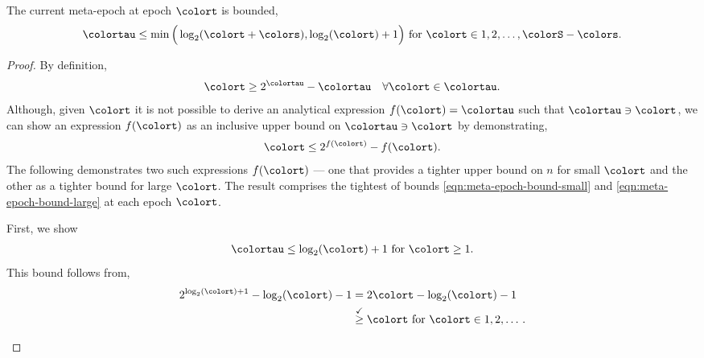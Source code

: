 \begin{lemma}
\label{thm:meta-epoch-bound}
The current meta-epoch at epoch $\colort$ is bounded,
\begin{align*}
\colortau \leq
\min\Big(
  \log_2(\colort + \colors),
  \log_2(\colort) + 1
\Big)
\text{ for } \colort \in 1, 2, \ldots, \colorS - \colors.
\end{align*}
\end{lemma}
\begin{proof}

By definition,
\begin{align*}
\colort \geq 2^{\colortau} - \colortau \quad \forall \colort \in \colortau.
\end{align*}
Although, given $\colort$ it is not possible to derive an analytical expression $f(\colort) = \colortau$ such that $\colortau \ni \colort$, we can show an expression $f(\colort)$ as an inclusive upper bound on $\colortau \ni \colort$ by demonstrating,
\begin{align*}
\colort \leq 2^{f(\colort)} - f(\colort).
\end{align*}
The following demonstrates two such expressions $f(\colort)$ --- one that provides a tighter upper bound on $n$ for small $\colort$ and the other as a tighter bound for large $\colort$.
The result comprises the tightest of bounds \ref{eqn:meta-epoch-bound-small} and \ref{eqn:meta-epoch-bound-large} at each epoch $\colort$.

\begin{proofpart}
First, we show
\begin{align}
\colortau \leq \log_2(\colort) + 1 \text{ for } \colort \geq 1.
\label{eqn:meta-epoch-bound-small}
\end{align}
This bound follows from,
\begin{align*}
2^{\log_{2}(\colort) + 1} - \log_2(\colort) - 1
&= 2\colort - \log_2(\colort) - 1 \\
&\stackrel{\checkmark}{\geq} \colort \text{ for } \colort \in 1, 2, \ldots \, .
\end{align*}
\end{proofpart}


\end{proof}
